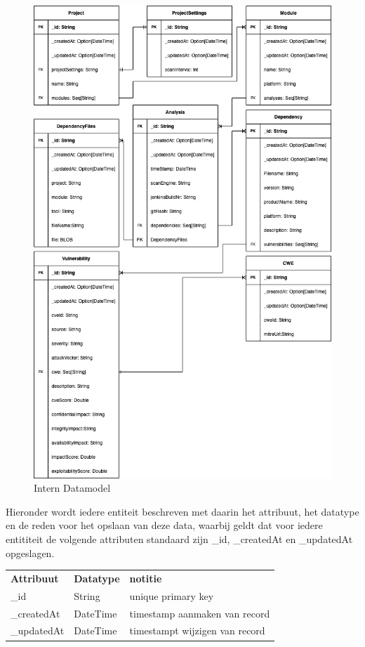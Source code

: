 \begin{figure}[H]
    \myfloatalign
    \includegraphics[width=12cm]{gfx/SOUPAPI-SOUPAPI DM}
    \caption{Intern Datamodel}
    \label{fig:SOUP-SoupApiDm}
\end{figure}

Hieronder wordt iedere entiteit beschreven met daarin het attribuut, het datatype en de reden voor het opslaan van deze data, waarbij geldt dat voor iedere entititeit de volgende attributen standaard zijn \_id, \_createdAt en \_updatedAt opgeslagen.

\begin{tabular}{lll}
    \textbf{Attribuut} & \textbf{Datatype} & \textbf{notitie}\\
    \_id & String & unique primary key\\
    \_createdAt & DateTime & timestamp aanmaken van record\\
    \_updatedAt & DateTime & timestampt wijzigen van record\\

\end{tabular}
